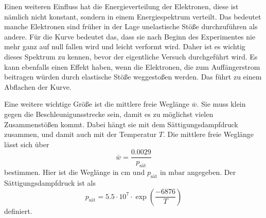 Einen weiteren Einfluss hat die Energieverteilung der Elektronen, diese ist nämlich nicht konstant, sondern in einem Energiespektrum verteilt. 
Das bedeutet manche Elektronen sind früher in der Lage unelastische Stöße durchzuführen als andere.
Für die Kurve bedeutet das, dass sie nach Beginn des Experimentes nie mehr ganz auf null fallen wird und leicht verformt wird.
Daher ist es wichtig dieses Spektrum zu kennen, bevor der eigentliche Versuch durchgeführt wird.
Es kann ebenfalls einen Effekt haben, wenn die Elektronen, die zum Auffängerstrom beitragen würden durch elastische Stöße weggestoßen werden. Das führt zu einem Abflachen der Kurve.

Eine weitere wichtige Größe ist die mittlere freie Weglänge $\bar{w}$. 
Sie muss klein gegen die Beschleunigunsstrecke sein, damit es zu möglichst vielen Zusammenstößen kommt.
Dabei hängt sie mit dem Sättigungsdampfdruck zusammen, und damit auch mit der Temperatur $T$.
Die mittlere freie Weglänge lässt sich über 
\begin{equation}
    \bar{w} = \frac{0.0029}{p_\text{sät}}
    \label{eq:wegl}
\end{equation}
bestimmen.
Hier ist die Weglänge in $\si{\centi\meter}$ und $p_\text{sät}$ in $\si{\milli\bar}$ angegeben.
Der Sättigungsdampfdruck ist als 
\begin{equation}
    p_\text{sät} = 5.5 \cdot 10^7 \cdot \exp{\left(\frac{-6876}{T}\right)}
    \label{eq:dampfdr}
\end{equation}
definiert.
